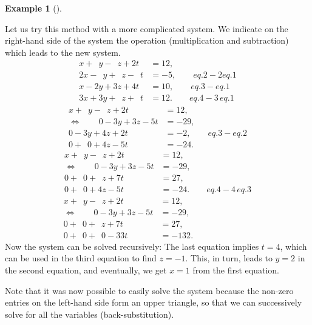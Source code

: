 \documentclass[
  a4paper,
  DIV=11,
  numbers=noendperiod,
  oneside]{scrreprt}
\theoremstyle{definition}
\newtheorem{example}{Example}[chapter]
\theoremstyle{remark}
\begin{document}
\begin{example}[]\protect\hypertarget{exm-ge1}{}\label{exm-ge1}

Let us try this method with a more complicated system. We indicate on
the right-hand side of the system the operation (multiplication and
subtraction) which leads to the new system. \[\begin{aligned}
 x+\phantom{2}y-\phantom{2}z+2t &= 12,\\
 2x-\phantom{2}y+\phantom{2}z-\phantom{2}t &=-5,    \qquad eq. 2- 2 eq. 1\\
 x-2y+3z+4t &= 10, \qquad eq.3-  eq.1\\ 
 3x+3y+\phantom{2}z+\phantom{2}t &= 12. \qquad eq.4- 3 \, eq.1
\end{aligned}\] \[\begin{aligned}
 x+\phantom{2}y-\phantom{2}z+2t &= 12,\\
\Leftrightarrow \qquad  0 - 3 y +3 z- 5 t &=-29,    \qquad  \\
 0-3y+4z+2t &= -2, \qquad eq.3 -  eq.2\\ 
 0+\phantom{2}0 +4 z -5 t &= -24. 
\end{aligned}\] \[\begin{aligned}
 x+\phantom{2}y-\phantom{2}z+2t &= 12,\\
\Leftrightarrow \qquad  0 - 3 y +3 z- 5 t &=-29,    \qquad  \\
 0 + \phantom{2}0 + \phantom{1} z+7t &= 27,\\ 
 0+\phantom{2}0 +4 z -5 t &= -24.  \qquad  eq.4- 4 \, eq.3
\end{aligned}\] \[\begin{aligned}
 x+\phantom{2}y-\phantom{2}z+2t &= 12,\\
\Leftrightarrow \qquad   0 - 3 y +3 z- 5 t &=-29,    \qquad  \phantom{eq.4- 4\, eq.3} \\
 0 + \phantom{2}0 + \phantom{1} z+7t &= 27,\\ 
 0+\phantom{2}0 + \phantom{2}0  -33 t &= -132.  
\end{aligned}\] Now the system can be solved recursively: The last
equation implies \(t=4\), which can be used in the third equation to
find \(z=-1\). This, in turn, leads to \(y=2\) in the second equation,
and eventually, we get \(x=1\) from the first equation.

\end{example}

Note that it was now possible to easily solve the system because the
non-zero entries on the left-hand side form an upper triangle, so that
we can successively solve for all the variables (back-substitution).
\end{document}
